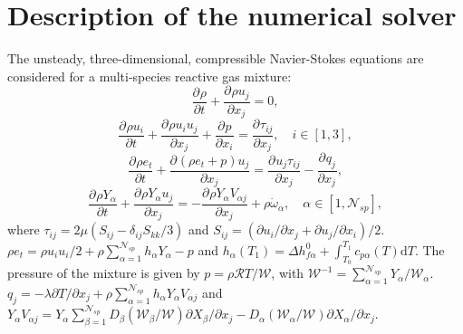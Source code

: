 \documentclass[conf]{new-aiaa}
\newcommand*{\pd}[3][]{\frac{\partial^{#1}#2}{\partial{#3}^{#1}}} %
\newcommand{\addim}[1]{{#1}} %
\newcommand{\Wcal}{\mathcal{W}}
\newcommand{\Rcal}{\mathcal{R}}
\newcommand{\nspc}{\mathcal{N}_{sp}}
\begin{document}
\section{Description of the numerical solver}
The unsteady, three-dimensional, compressible Navier-Stokes equations are considered for a multi-species reactive gas mixture:
\begin{equation}\label{eq:eqs_originelles_ch_i}
\pd{\addim{\rho}}{\addim{t}}+
\pd{\addim{\rho} \addim{u}_j}{\addim{x}_j}=0 ,
\end{equation}
\begin{equation}
\pd{\addim{\rho} \addim{u}_i}{\addim{t}}+
\pd{\addim{\rho} \addim{u}_i \addim{u}_j}{\addim{x}_j}
+\pd{\addim{p}}{\addim{x}_i}=\pd{\addim{\tau}_{ij}}{\addim{x}_j} , \quad
i \in \left[ 1,3 \right] ,
\end{equation}
\begin{equation}
\pd{\addim{\rho} \addim{e}_t}{\addim{t}}+
\pd{\left(\addim{\rho} \addim{e}_t + \addim{p} \right)\addim{u}_j}
{\addim{x}_j}=
\pd{\addim{u}_j\addim{\tau}_{ij}}{\addim{x}_j}
-\pd{\addim{q}_j}{\addim{x}_j} , \label{eq:energie_ch}
\end{equation}
\begin{equation}
\pd{\addim{\rho}Y_\alpha}{\addim{t}}+
\pd{\addim{\rho} Y_\alpha \addim{u}_j}{\addim{x}_j}=
-\pd{\addim{\rho} Y_\alpha \addim{V}_{\alpha j}}{\addim{x}_j} +
\addim{\rho} \addim{\dot{\omega}}_\alpha , \quad
\alpha \in \left[ 1,\nspc \right] ,
\label{eq:eqs_originelles_ch_f}
\end{equation}
where $\addim{\tau}_{ij}=2\addim{\mu}\left(\addim{S}_{ij} - \delta_{ij} \addim{S}_{kk} / 3 \right)$ and $\addim{S}_{ij}=\left(\partial{\addim{u}_i}/\partial{\addim{x}_j}+
\partial{\addim{u}_j}/\partial{\addim{x}_i}\right)/2$. $\addim{\rho}\addim{e}_t=\addim{\rho}{\addim{u}_i\addim{u}_i}/{2}+ \addim{\rho}\sum^{\nspc}_{\alpha=1} \addim{h}_\alpha Y_\alpha - \addim{p}$ and $\addim{h}_\alpha \left(\addim{T}_1\right) =  \Delta {\addim{h}}^0_{f\alpha} + \int^{\addim{T}_1}_{\addim{T}_0}  \addim{c}_{p\alpha} \left(\addim{T}\right) \mathrm{d} \addim{T}$. The pressure of the mixture is given by $\addim{p}=\addim{\rho}{\Rcal}\addim{T}/{\Wcal}$, with $\Wcal^{-1}=\sum^{\nspc}_{\alpha=1} {Y_\alpha}/{\Wcal_\alpha}$. $\addim{q}_j=-\addim{\lambda} \partial{\addim{T}}/\partial{\addim{x}_j} + \addim{\rho} \sum^{\nspc}_{\alpha=1}  \addim{h}_\alpha Y_\alpha \addim{V}_{\alpha j} $ and $Y_{\alpha}\addim{V}_{\alpha j} = Y_{\alpha}   \sum^{\nspc}_{\beta=1} \addim{D}_{\beta} ({\Wcal_{\beta}}/{\Wcal}) \partial{X_{\beta}}/\partial{\addim{x}_j} - \addim{D}_{\alpha} ({\Wcal_{\alpha}}/{\Wcal}) \partial{X_{\alpha}}/\partial{\addim{x}_j} $.
\end{document}
